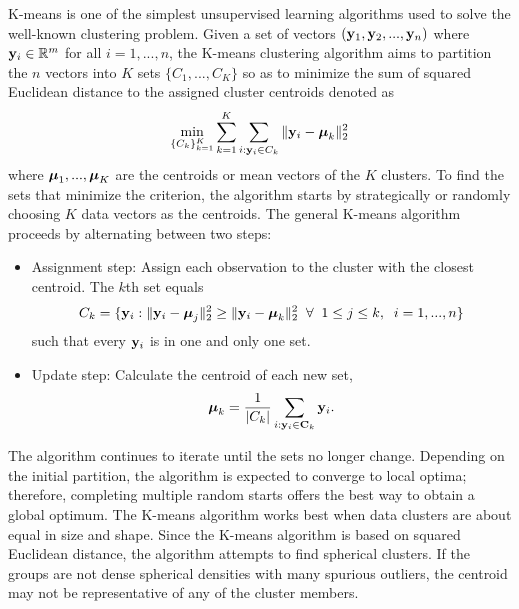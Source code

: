 K-means is one of the simplest unsupervised learning algorithms used to solve the well-known clustering problem. Given a set of vectors $(\mathbf y_{1},\mathbf y_{2},...,\mathbf y_{n})$ where $\mathbf y_{i}\in\mathbb{R}^{m}$ for all $i=1,...,n$, the K-means clustering algorithm aims to partition the $n$ vectors into $K$ sets $\{C_{1},...,C_{K}\}$ so as to minimize the sum of squared Euclidean distance to the assigned cluster centroids denoted as
$$\min_{\{C_{k}\}_{k=1}^{K}}\sum_{k=1}^{K}\sum_{i: \mathbf y_{i}\in C_{k}}\|\mathbf y_{i} -\boldsymbol \mu_{k}\|_{2}^{2}$$
where $\boldsymbol\mu_{1},...,\boldsymbol\mu_{K}$ are the centroids or mean vectors of the $K$ clusters. To find the sets that minimize the criterion, the algorithm starts by strategically or randomly choosing $K$ data vectors as the centroids. The general K-means algorithm proceeds by alternating between two steps:
\begin{itemize}
\item Assignment step: Assign each observation to the cluster with the closest centroid. The $k$th set equals
$$ C_{k} = \{\mathbf y_{i}: \|\mathbf y_{i} - \boldsymbol\mu_{j}\|_{2}^{2}\geq \|\mathbf y_{i} - \boldsymbol\mu_{k}\|_{2}^{2} \;\;\forall\;\; 1\leq j\leq k,\;\; i=1,...,n\}$$
such that every $\mathbf y_{i}$ is in one and only one set.
\item Update step: Calculate the centroid of each new set,
$$\boldsymbol\mu_{k} = \frac{1}{|C_{k}|}\sum_{i: \mathbf y_{i}\in\mathbf C_{k}} \mathbf y_{i}.$$
\end{itemize}
The algorithm continues to iterate until the sets no longer change. Depending on the initial partition, the algorithm is expected to converge to local optima; therefore, completing multiple random starts offers the best way to obtain a global optimum. The K-means algorithm works best when data clusters are about equal in size and shape. Since the K-means algorithm is based on squared Euclidean distance, the algorithm attempts to find spherical clusters. If the groups are not dense spherical densities with many spurious outliers, the centroid may not be representative of any of the cluster members.

